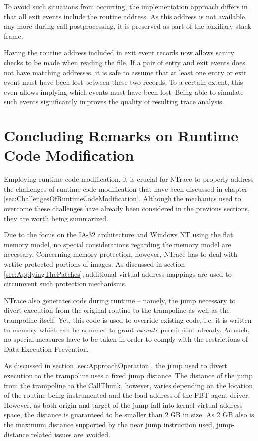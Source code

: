 To avoid such situations from occurring, the implementation approach differs in that
all exit events include the routine address. As this address is not available any 
more during call postprocessing, it is preserved as part of the auxiliary stack frame.

Having the routine address included in exit event records now allows sanity checks
to be made when reading the file. If a pair of entry and exit events does not have
matching addresses, it is safe to assume that at least one entry or exit event must
have been lost between these two records. To a certain extent, this even allows
implying which events must have been lost. Being able to simulate such events 
significantly improves the quality of resulting trace analysis. 

\section{Concluding Remarks on Runtime Code Modification}
Employing runtime code modification, it is crucial for NTrace to properly address
the challenges of runtime code modification that have been discussed in 
chapter \ref{sec:ChallengesOfRuntimeCodeModification}. Although the mechanics used to
overcome these challenges have already been considered in the previous sections,
they are worth being summarized.

Due to the focus on the IA-32 architecture and Windows NT using the flat memory model, 
no special considerations regarding the memory model are necessary. Concerning memory
protection, however, NTrace has to deal with wrtite-protected portions of images. As 
discussed in section \ref{sec:ApplyingThePatches}, additional virtual address mappings 
are used to circumvent such protection mechanisms. 

NTrace also generates code during runtime -- namely, the jump necessary to divert execution
from the original routine to the trampoline as well as the trampoline itself. Yet, this 
code is used to override existing code, i.e. it is written to memory which can be assumed to 
grant \emph{execute} permissions already. As such, no special measures have to be taken in 
order to comply with the restrictions of Data Execution Prevention.

As discussed in section \ref{sec:ApproachOperation}, the jump used to divert execution to the trampoline
uses a fixed jump distance. The distance of the jump from the trampoline to the CallThunk, however,
varies depending on the location of the routine being instrumented and the load address of the
FBT agent driver. However, as both origin and target of the jump fall into kernel virtual address space,
the distance is guaranteed to be smaller than 2 GB in size. As 2 GB also is the maximum distance
supported by the near jump instruction used, jump-distance related issues are avoided.

